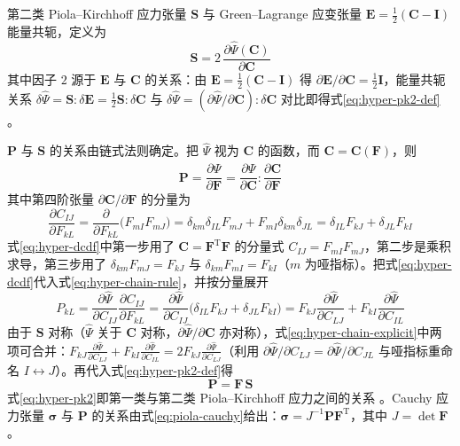 第二类 Piola--Kirchhoff 应力张量 $\mathbf{S}$ 与 Green--Lagrange 应变张量 $\mathbf{E}=\tfrac{1}{2}(\mathbf{C}-\mathbf{I})$ 能量共轭，定义为
\begin{equation}
  \mathbf{S}=2\,\frac{\partial\hat{\Psi}(\mathbf{C})}{\partial\mathbf{C}}
  \label{eq:hyper-pk2-def}
\end{equation}
其中因子 $2$ 源于 $\mathbf{E}$ 与 $\mathbf{C}$ 的关系：由 $\mathbf{E}=\tfrac{1}{2}(\mathbf{C}-\mathbf{I})$ 得 $\partial\mathbf{E}/\partial\mathbf{C}=\tfrac{1}{2}\mathbf{I}$，能量共轭关系 $\delta\hat{\Psi}=\mathbf{S}:\delta\mathbf{E}=\tfrac{1}{2}\mathbf{S}:\delta\mathbf{C}$ 与 $\delta\hat{\Psi}=(\partial\hat{\Psi}/\partial\mathbf{C}):\delta\mathbf{C}$ 对比即得式\eqref{eq:hyper-pk2-def} \cite{Ogden1997}。

$\mathbf{P}$ 与 $\mathbf{S}$ 的关系由链式法则确定。把 $\hat{\Psi}$ 视为 $\mathbf{C}$ 的函数，而 $\mathbf{C}=\mathbf{C}(\mathbf{F})$，则
\begin{equation}
  \mathbf{P}=\frac{\partial\Psi}{\partial\mathbf{F}}
  =\frac{\partial\hat{\Psi}}{\partial\mathbf{C}}:\frac{\partial\mathbf{C}}{\partial\mathbf{F}}
  \label{eq:hyper-chain-rule}
\end{equation}
其中第四阶张量 $\partial\mathbf{C}/\partial\mathbf{F}$ 的分量为
\begin{equation}
  \frac{\partial C_{IJ}}{\partial F_{kL}}
  =\frac{\partial}{\partial F_{kL}}\bigl(F_{mI}F_{mJ}\bigr)
  =\delta_{km}\delta_{IL}F_{mJ}+F_{mI}\delta_{km}\delta_{JL}
  =\delta_{IL}F_{kJ}+\delta_{JL}F_{kI}
  \label{eq:hyper-dcdf}
\end{equation}
式\eqref{eq:hyper-dcdf}中第一步用了 $\mathbf{C}=\mathbf{F}^{\mathrm{T}}\mathbf{F}$ 的分量式 $C_{IJ}=F_{mI}F_{mJ}$，第二步是乘积求导，第三步用了 $\delta_{km}F_{mJ}=F_{kJ}$ 与 $\delta_{km}F_{mI}=F_{kI}$（$m$ 为哑指标）。把式\eqref{eq:hyper-dcdf}代入式\eqref{eq:hyper-chain-rule}，并按分量展开
\begin{equation}
  P_{kL}=\frac{\partial\hat{\Psi}}{\partial C_{IJ}}\frac{\partial C_{IJ}}{\partial F_{kL}}
  =\frac{\partial\hat{\Psi}}{\partial C_{IJ}}\bigl(\delta_{IL}F_{kJ}+\delta_{JL}F_{kI}\bigr)
  =F_{kJ}\frac{\partial\hat{\Psi}}{\partial C_{LJ}}+F_{kI}\frac{\partial\hat{\Psi}}{\partial C_{IL}}
  \label{eq:hyper-chain-explicit}
\end{equation}
由于 $\mathbf{S}$ 对称（$\hat{\Psi}$ 关于 $\mathbf{C}$ 对称，$\partial\hat{\Psi}/\partial\mathbf{C}$ 亦对称），式\eqref{eq:hyper-chain-explicit}中两项可合并：$F_{kJ}\frac{\partial\hat{\Psi}}{\partial C_{LJ}}+F_{kI}\frac{\partial\hat{\Psi}}{\partial C_{IL}}=2F_{kJ}\frac{\partial\hat{\Psi}}{\partial C_{LJ}}$（利用 $\partial\hat{\Psi}/\partial C_{LJ}=\partial\hat{\Psi}/\partial C_{JL}$ 与哑指标重命名 $I\leftrightarrow J$）。再代入式\eqref{eq:hyper-pk2-def}得
\begin{equation}
  \mathbf{P}=\mathbf{F}\,\mathbf{S}
  \label{eq:hyper-pk2}
\end{equation}
式\eqref{eq:hyper-pk2}即第一类与第二类 Piola--Kirchhoff 应力之间的关系 \cite{Ogden1997}。Cauchy 应力张量 $\boldsymbol{\sigma}$ 与 $\mathbf{P}$ 的关系由式\eqref{eq:piola-cauchy}给出：$\boldsymbol{\sigma}=J^{-1}\mathbf{P}\mathbf{F}^{\mathrm{T}}$，其中 $J=\det\mathbf{F}$。

